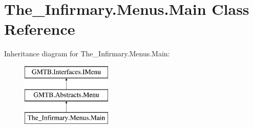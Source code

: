 \hypertarget{class_the___infirmary_1_1_menus_1_1_main}{}\section{The\+\_\+\+Infirmary.\+Menus.\+Main Class Reference}
\label{class_the___infirmary_1_1_menus_1_1_main}
Inheritance diagram for The\+\_\+\+Infirmary.\+Menus.\+Main\+:\begin{figure}[H]
\begin{center}
\leavevmode
\includegraphics[height=3.000000cm]{class_the___infirmary_1_1_menus_1_1_main}
\end{center}
\end{figure}
